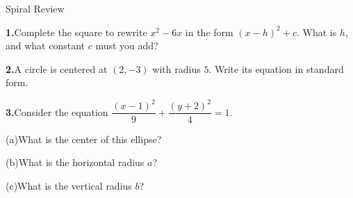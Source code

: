 \documentclass[10pt]{article}
\begin{document}
\namedateperiod

\vspace{0.12in}

\begin{notesbox}{Spiral Review}

\textbf{1.}\quad Complete the square to rewrite $x^2 - 6x$ in the form
$(x - h)^2 + c$. What is $h$, and what constant $c$ must you add?


\vspace{0.06in}

\textbf{2.}\quad A circle is centered at $(2, -3)$ with radius $5$.
Write its equation in standard form.


\vspace{0.06in}

\textbf{3.}\quad Consider the equation
$\dfrac{(x-1)^2}{9} + \dfrac{(y+2)^2}{4} = 1$.

\vspace{4pt}
(a)\quad What is the center of this ellipse? \writeline

(b)\quad What is the horizontal radius $a$? \writeline

(c)\quad What is the vertical radius $b$? \writeline

\end{notesbox}
\end{document}
